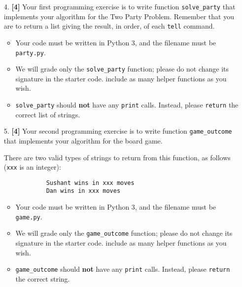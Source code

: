 \documentclass{assignment-263}
\begin{document}
\begin{enumerate}
	\item[4.] \textbf{[4]} Your first programming exercise is to write function
	\verb|solve_party| that implements your algorithm for the Two Party Problem. Remember that you are to return a list giving the result, in order, of each \verb|tell| command.
		\begin{itemize}
		\item Your code must be written in Python 3, and the filename must be \verb|party.py|.
\item We will grade only the \verb|solve_party| function; please do not change its signature in the starter code. include as many helper functions as you wish.
				\item \verb|solve_party| should {\bf not} have any
				\verb|print| calls. Instead, please \verb|return| the correct list of strings.
			\end{itemize}
			

	
	\item[5.] \textbf{[4]} Your second programming exercise is to write function
	\verb|game_outcome| that implements your algorithm for the board
	game.

		There are two valid types of strings to return from this function,
		as follows (\verb|xxx| is an integer):
		\begin{small}
			\begin{verbatim}
			Sushant wins in xxx moves
			Dan wins in xxx moves
			\end{verbatim}
		\end{small}

		\begin{itemize}
		\item Your code must be written in Python 3, and the filename must be \verb|game.py|.
\item We will grade only the \verb|game_outcome| function; please do not change its signature in the starter code. include as many helper functions as you wish.
				\item \verb|game_outcome| should {\bf not} have any
				\verb|print| calls. Instead, please \verb|return| the correct string.
			\end{itemize}
			
\end{enumerate}
\end{document}
